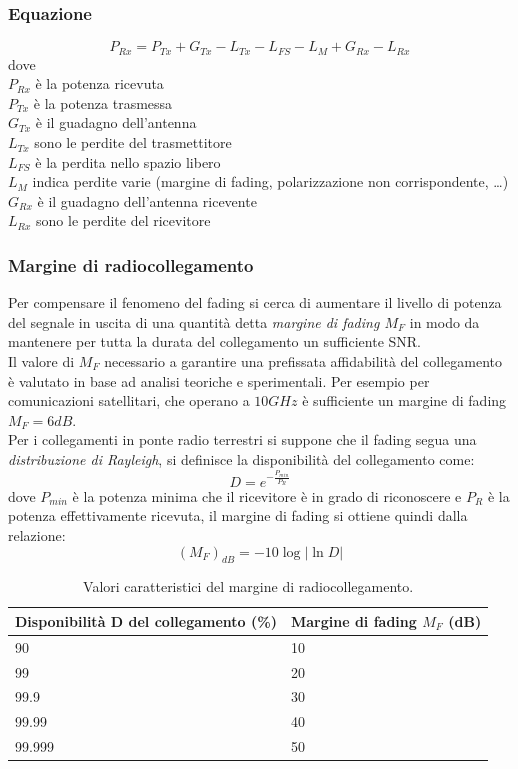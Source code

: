 \subsubsection{Equazione}
\[
 P_{Rx} = P_{Tx} + G_{Tx} - L_{Tx} - L_{FS} - L_{M} + G_{Rx} - L_{Rx}
\]
dove \\
$P_{Rx}$ è la potenza ricevuta \\
$P_{Tx}$ è la potenza trasmessa \\
$G_{Tx}$ è il guadagno dell'antenna \\
$L_{Tx}$ sono le perdite del trasmettitore \\
$L_{FS}$ è la perdita nello spazio libero \\
$L_{M}$ indica perdite varie (margine di fading, polarizzazione non corrispondente, \ldots) \\
$G_{Rx}$ è il guadagno dell'antenna ricevente \\
$L_{Rx}$ sono le perdite del ricevitore \\

\subsubsection{Margine di radiocollegamento}
Per compensare il fenomeno del fading si cerca di aumentare il livello di potenza del segnale in uscita di una quantità detta
\emph{margine di fading $M_{F}$} in modo da mantenere per tutta la durata del collegamento un sufficiente \ac{SNR}. \\
Il valore di $M_{F}$ necessario a garantire una prefissata affidabilità del collegamento è valutato in base ad analisi teoriche e 
sperimentali. Per esempio per comunicazioni satellitari, che operano a $10GHz$ è sufficiente un margine di fading $M_{F} = 6 dB$. \\
Per i collegamenti in ponte radio terrestri si suppone che il fading segua una \emph{distribuzione di Rayleigh}, si definisce la 
disponibilità del collegamento come:
\[
 D = e^{-\frac{P_{min}}{P_{R}}}
\]
dove $P_{min}$ è la potenza minima che il ricevitore è in grado di riconoscere e $P_{R}$ è la potenza effettivamente ricevuta, il margine
di fading si ottiene quindi dalla relazione:
\[
 (M_{F})_{dB} = -10\log{\left | \ln{D} \right | }
\]

\begin{table}[h]\footnotesize
\caption{Valori caratteristici del margine di radiocollegamento.}
\label{tab:margine}
\begin{tabularx}{\textwidth}{XX}
\toprule
Disponibilità D del collegamento (\%) & Margine di fading $M_{F}$ (dB) \\
\midrule
90 & 10 \\
99 & 20 \\
99.9 & 30 \\
99.99 & 40 \\
99.999 & 50 \\
\bottomrule
\end{tabularx}
\end{table}

